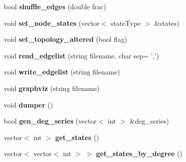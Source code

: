 \begin{DoxyCompactItemize}
\item 
\hypertarget{classelps_1_1_lab_network_a737502a450631377840387e993b53cd3}{bool {\bfseries shuffle\+\_\+edges} (double frac)}\label{classelps_1_1_lab_network_a737502a450631377840387e993b53cd3}

\item 
\hypertarget{classelps_1_1_lab_network_a5c9f04f024b8a71f0c27d2adc3340e4f}{void {\bfseries set\+\_\+node\+\_\+states} (vector$<$ state\+Type $>$ \&states)}\label{classelps_1_1_lab_network_a5c9f04f024b8a71f0c27d2adc3340e4f}

\item 
\hypertarget{classelps_1_1_lab_network_a7bc3da86abcd937f69f3b5d767e5b6f4}{void {\bfseries set\+\_\+topology\+\_\+altered} (bool flag)}\label{classelps_1_1_lab_network_a7bc3da86abcd937f69f3b5d767e5b6f4}

\item 
\hypertarget{classelps_1_1_lab_network_acbc1686894dfb5534520732c15c83fe6}{void {\bfseries read\+\_\+edgelist} (string filename, char sep= ',')}\label{classelps_1_1_lab_network_acbc1686894dfb5534520732c15c83fe6}

\item 
\hypertarget{classelps_1_1_lab_network_aaeb95b5cdeee0b64fbb59a5f185caf2b}{void {\bfseries write\+\_\+edgelist} (string filename)}\label{classelps_1_1_lab_network_aaeb95b5cdeee0b64fbb59a5f185caf2b}

\item 
\hypertarget{classelps_1_1_lab_network_aa594d7fa73c3cf81dfefb331f8cc50c5}{void {\bfseries graphviz} (string filename)}\label{classelps_1_1_lab_network_aa594d7fa73c3cf81dfefb331f8cc50c5}

\item 
\hypertarget{classelps_1_1_lab_network_a6468ba129125eca0b5e6286ddf798f8c}{void {\bfseries dumper} ()}\label{classelps_1_1_lab_network_a6468ba129125eca0b5e6286ddf798f8c}

\item 
\hypertarget{classelps_1_1_lab_network_ae8ecc74c372d8a13c01d22bd4936b5bc}{bool {\bfseries gen\+\_\+deg\+\_\+series} (vector$<$ int $>$ \&deg\+\_\+series)}\label{classelps_1_1_lab_network_ae8ecc74c372d8a13c01d22bd4936b5bc}

\item 
\hypertarget{classelps_1_1_lab_network_a612ff25d66d51bd0c32efe965049a908}{vector$<$ int $>$ {\bfseries get\+\_\+states} ()}\label{classelps_1_1_lab_network_a612ff25d66d51bd0c32efe965049a908}

\item 
\hypertarget{classelps_1_1_lab_network_a290cb80cbb0d496252eae9d828851a16}{vector$<$ vector$<$ int $>$ $>$ {\bfseries get\+\_\+states\+\_\+by\+\_\+degree} ()}\label{classelps_1_1_lab_network_a290cb80cbb0d496252eae9d828851a16}


\end{DoxyCompactItemize}
